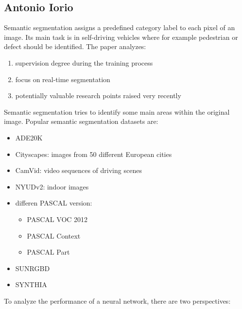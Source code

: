 \documentclass{article}
\begin{document}
        \subsection{Antonio Iorio}
        Semantic segmentation assigns a predefined category label to each pixel of an image.
        Its main task is in self-driving vehicles where for example pedestrian or defect 
        should be identified. The paper analyzes:
        \begin{enumerate}
            \item supervision degree during the training process
            \item focus on real-time segmentation
            \item potentially valuable research points raised very recently 
        \end{enumerate}
        Semantic segmentation tries to identify some main areas within the original image.
        Popular semantic segmentation datasets are:
        \begin{itemize}
            \item ADE20K
            \item Cityscapes: images from 50 different European cities
            \item CamVid: video sequences of driving scenes
            \item NYUDv2: indoor images
            \item differen PASCAL version:
            \begin{itemize}
                \item PASCAL VOC 2012
                \item PASCAL Context
                \item PASCAL Part
            \end{itemize}
            \item SUNRGBD
            \item SYNTHIA
        \end{itemize}
        To analyze the performance of a neural network, there are two perspectives:
\end{document}
